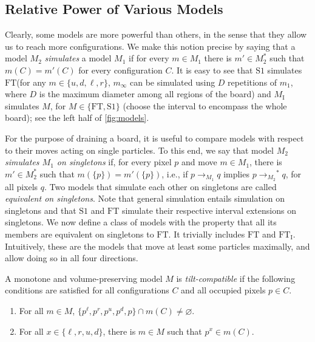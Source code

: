 \documentclass[a4paper,UKenglish,cleveref,thm-restate]{lipics-v2021}
\newcommand{\FT}{\ensuremath{\mathrm{FT}}\xspace}
\newcommand{\SSt}{\ensuremath{\mathrm{S1}}\xspace}
\newcommand{\IE}[1][\FT]{\ensuremath{{#1}_\mathrm{I}}\xspace}
\newcommand{\rOne}[1][M]{\ensuremath{\rightarrow_{#1}}}
\newcommand{\rStar}[1][M]{\rOne[#1]^*}
\begin{document}
\subsection{Relative Power of Various Models}\label{subsec:relative}

Clearly, some models are more powerful than others, in the sense that they allow
us to reach more configurations. We make this notion precise by saying that a
model $M_2$ \emph{simulates} a model $M_1$ if for every $m \in M_1$ there is $m'
\in M_2^*$ such that $m(C) = m'(C)$ for every configuration $C$. It is easy to
see that \SSt simulates \FT (for any \(m \in \{u, d, \ell, r\}\), $m_\infty$
can be simulated using $D$ repetitions of $m_1$, where $D$ is the maximum
diameter among all regions of the board) and \IE[M] simulates $M$, for \(M \in
\{\FT, \SSt\}\) (choose the interval to encompass the whole board); see the left
half of \cref{fig:models}.

For the purpose of draining a board, it is useful to compare models with respect
to their moves acting on single particles. To this end, we say that model $M_2$
\emph{simulates $M_1$ on singletons} if, for every pixel $p$ and move \(m \in
M_1\), there is $m' \in M_2^*$ such that \(m(\{p\}) = m'(\{p\})\), i.e., if \(p
\rOne[M_1] q\) implies $p \rStar[M_2] q$, for all pixels $q$. Two models that
simulate each other on singletons are called \emph{equivalent on singletons}.
Note that general simulation entails simulation on singletons and that \SSt
and \FT simulate their respective interval extensions on singletons. We now
define a class of models with the property that all its members are equivalent
on singletons to \FT. It trivially includes \FT and \IE. Intuitively, these are
the models that move at least some particles maximally, and allow doing so in
all four directions.

\begin{definition}\label{def:tilt-compat}
A monotone and volume-preserving model $M$ is \emph{tilt-compatible} if the
following conditions are satisfied for all configurations $C$ and all occupied
pixels $p \in C$.
\begin{enumerate}
  \item For all $m \in M$, \(\{p^\ell, p^r, p^u, p^d, p\} \cap m(C) \neq
    \varnothing\).\label{tc_bound}
  \item For all \(x \in \{\ell, r, u, d\}\), there is $m \in M$ such that
    \(p^x \in m(C)\).\label{tc_choose}
\end{enumerate}
\end{definition}
\end{document}
